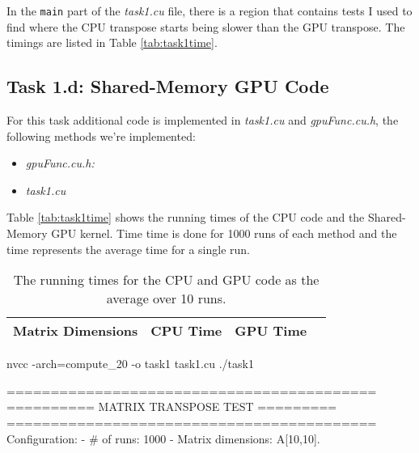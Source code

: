 In the \texttt{main} part of the \textit{task1.cu} file, there is a region that
contains tests I used to find where the CPU transpose starts being slower than
the GPU transpose. The timings are listed in Table \ref{tab:task1time}.


\subsection{Task 1.d: Shared-Memory GPU Code}
For this task additional code is implemented in \textit{task1.cu} and
\textit{gpuFunc.cu.h}, the following methods we're implemented:
\begin{itemize}
    \item \textit{gpuFunc.cu.h:}

    \item \textit{task1.cu}
\end{itemize}

Table \ref{tab:task1time} shows the running times of the CPU code and the
Shared-Memory GPU kernel. Time time is done for 1000 runs of each method and the
time represents the average time for a single run.

\begin{table}
    \begin{tabular}{|l|l|l|l|}
        \hline
        \textbf{Matrix Dimensions} & \textbf{CPU Time} & \textbf{GPU Time} \\\hline

    \end{tabular}
    \caption{The running times for the CPU and GPU code as the average over 10
    runs.}
    \label{tab:task1d}
\end{table}

nvcc -arch=compute_20 -o task1 task1.cu
./task1

==========================================
========== MATRIX TRANSPOSE TEST =========
==========================================
Configuration:
 - # of runs: 1000
 - Matrix dimensions: A[10,10].

